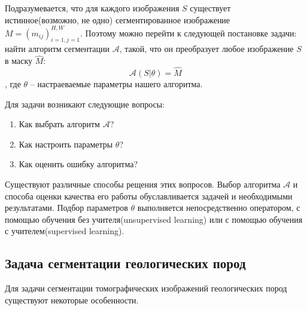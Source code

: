 \documentclass[12pt, a4paper]{extarticle}
\makeatletter
\newcommand{\problemtitle}[1]{\gdef\@problemtitle{#1}}%
\newcommand{\probleminput}[1]{\gdef\@probleminput{#1}}%
\newcommand{\problemquestion}[1]{\gdef\@problemquestion{#1}}%
\makeatother
\begin{document}
\begin{problem}
  \problemtitle{\textbf{Задача сегментации изображения}}
  \probleminput{изображение 
	$S = (s_{ij})_{i=1, j=1}^{H, W},\ s_{ij} \in [0, 1]$, где 
$H$ -- высота изображения, $W$ -- ширина изображения.}
  \problemquestion{для каждого пикселя соответствующий ему сегмент изображения, 
т.е. соответствие $s_{ij} \rightarrow m_{ij},\ m_{ij} \in C = \{ 0, ... , N_c-1 \} $,
где $N_c$ -- число различных сегментов.
}
\end{problem}

Подразумевается, что для каждого изображения $S$ существует 
истинное(возможно, не одно) сегментированное изображение $M = (m_{ij})_{i=1, j=1}^{H, W}$.
Поэтому можно перейти к следующей постановке задачи: найти алгоритм сегментации $\mathcal{A}$, такой, что он преобразует любое 
изображение $S$ в  маску $\hat{M}$:
\begin{equation} \label{unsupervised}
	\mathcal{A}(S | \theta) = \hat{M}
\end{equation} 
, где $\theta$ -- настраеваемые параметры нашего алгоритма.

Для задачи возникают следующие вопросы:
\begin{enumerate}
	\item Как выбрать алгоритм $\mathcal{A}$?
	\item Как настроить параметры $\theta$?
	\item Как оценить ошибку алгоритма?
\end{enumerate}
Существуют различные способы рещения этих вопросов.
Выбор алгоритма $\mathcal{A}$ и способа оценки качества его работы обуславливается задачей и необходимыми результатами. 
Подбор параметров $\theta$ выполняется непосредственно 
оператором, с помощью 
обучения без учителя(unsupervised learning) или с помощью обучения с учителем(supervised learning).

\newpage

\subsection{Задача сегментации геологических пород} \label{seg_features}

Для задачи сегментации томографических изображений геологических пород существуют некоторые особенности. 

\begin{problem}
  \problemtitle{\textbf{Задача сегментации томографических изображений}}
  \probleminput{исходный стек изображений 
	$S = (s_{ijk})_{i=1, j=1, k=1}^{H, W, D},\ s_{ijk} \in [0, 1]$, где 
$H$ -- высота изображения, $W$ -- ширина изображения, $D$ -- количество изображений. }
  \problemquestion{для каждого пикселя соответствующую ему метку класса, 
т.е. соответствие $s_{ijk} \rightarrow m_{ijk},\ m_{ijk} \in C = \{ 0, 1 \} $, где класс $0$ соответсвтует полостям в веществе, а класс $1$ -- твердому веществу.
}
\end{problem}
\end{document}
